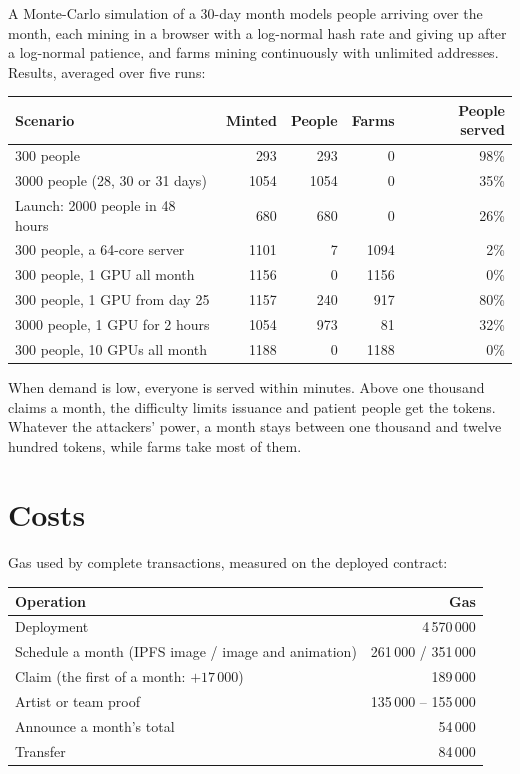 \documentclass[10pt,letterpaper]{article}
\begin{document}
A Monte-Carlo simulation of a 30-day month models people arriving over the month, each mining in a browser with a
log-normal hash rate and giving up after a log-normal patience, and farms mining continuously with unlimited
addresses. Results, averaged over five runs:

\begin{center}
\begin{tabular}{lrrrr}
\toprule
Scenario & Minted & People & Farms & People served \\
\midrule
300 people & 293 & 293 & 0 & 98\% \\
3000 people (28, 30 or 31 days) & 1054 & 1054 & 0 & 35\% \\
Launch: 2000 people in 48 hours & 680 & 680 & 0 & 26\% \\
300 people, a 64-core server & 1101 & 7 & 1094 & 2\% \\
300 people, 1 GPU all month & 1156 & 0 & 1156 & 0\% \\
300 people, 1 GPU from day 25 & 1157 & 240 & 917 & 80\% \\
3000 people, 1 GPU for 2 hours & 1054 & 973 & 81 & 32\% \\
300 people, 10 GPUs all month & 1188 & 0 & 1188 & 0\% \\
\bottomrule
\end{tabular}
\end{center}

When demand is low, everyone is served within minutes. Above one thousand claims a month, the difficulty limits
issuance and patient people get the tokens. Whatever the attackers' power, a month stays between one thousand and
twelve hundred tokens, while farms take most of them.

\section{Costs}

Gas used by complete transactions, measured on the deployed contract:

\begin{center}
\begin{tabular}{lr}
\toprule
Operation & Gas \\
\midrule
Deployment & 4\,570\,000 \\
Schedule a month (IPFS image / image and animation) & 261\,000 / 351\,000 \\
Claim (the first of a month: $+17\,000$) & 189\,000 \\
Artist or team proof & 135\,000 -- 155\,000 \\
Announce a month's total & 54\,000 \\
Transfer & 84\,000 \\
\bottomrule
\end{tabular}
\end{center}
\end{document}
